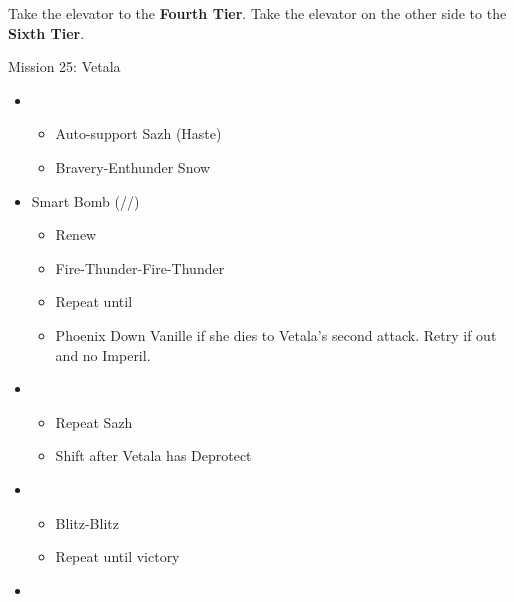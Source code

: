 \begin{multicols}{2}
\begin{menu}
\begin{itemize}
\begin{itemize}
\begin{itemize}
        \end{itemize}
    \end{itemize}
\end{itemize}
\end{menu}
Take the elevator to the \textbf{Fourth Tier}.
Take the elevator on the other side to the \textbf{Sixth Tier}.
\renewcommand{\fifth}{[5] Smart Bomb (\rav/\sab/\rav)}
\begin{battle}{Mission 25: Vetala}
\begin{itemize}
    \item \first
    \begin{itemize}
        \item Auto-support Sazh (Haste)
        \item Bravery-Enthunder Snow
    \end{itemize}
    \item \fifth
    \begin{itemize}
        \item Renew
        \item Fire-Thunder-Fire-Thunder
        \item Repeat until \stagger
        \item Phoenix Down Vanille if she dies to Vetala's second attack. Retry if out and no Imperil.
    \end{itemize}
    \columnbreak
    \item \first
    \begin{itemize}
        \item Repeat Sazh
        \item Shift after Vetala has Deprotect
    \end{itemize}
    \item \second
    \begin{itemize}
        \item Blitz-Blitz
        \item Repeat until victory
    \end{itemize}
\end{itemize}
\end{battle}
\begin{menu}
\begin{itemize}
    \paradigm
    \begin{itemize}
        \item {}%
{\paradigmline{\syn}{(\rav)}{(\sen)}}%
{\paradigmline[2]{\textit{\com}}{\textit{(\rav)}}{\textit{(\rav)}}}%

\end{itemize}
\end{itemize}
\end{menu}
\end{multicols}
